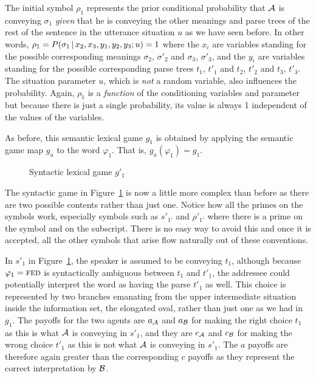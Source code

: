 The initial symbol $\rho_1$ represents the prior conditional probability that $\cal A$ is conveying $\sigma_1$ \emph{given} that he is conveying the other meanings and parse trees of the rest of the sentence in the utterance situation $u$ as we have seen before. In other words, $\rho_1 = P(\sigma_1 \,|\, x_2, x_3, y_1, y_2, y_3; u) = 1$ where the $x_i$ are variables standing for the possible corresponding meanings $\sigma_2$, $\sigma'_2$ and $\sigma_3$, $\sigma'_3$, and the $y_i$ are variables standing for the possible corresponding parse trees $t_1$, $t'_1$ and $t_2$, $t'_2$ and $t_3$, $t'_3$. The situation parameter $u$, which is \emph{not} a random variable, also influences the probability. Again, $\rho_1$ is a \emph{function} of the conditioning variables and parameter but because there is just a single probability, its value is always 1 independent of the values of the variables. 

As before, this semantic lexical game $g_1$ is obtained by applying the semantic game map $g_u$ to the word $\varphi_1$. That is, $g_u(\varphi_1) = g_1$.

\begin{figure}[h] 

\caption{Syntactic lexical game $g'_1$}
\label{fig:syntactic lexical game g1' - new example}
\end{figure}

The syntactic game in Figure~\ref{fig:syntactic lexical game g1' - new example} is now a little more complex than before as there are two possible contents rather than just one. Notice how all the primes on the symbols work, especially symbols such as $s'_{1'}$ and $\rho'_{1'}$ where there is a prime on the symbol and on the subscript. There is no easy way to avoid this and once it is accepted, all the other symbols that arise flow naturally out of these conventions.

In $s'_1$ in Figure~\ref{fig:syntactic lexical game g1' - new example}, the speaker is assumed to be conveying $t_1$, although because $\varphi_1 = \Expression{Fed}$ is syntactically ambiguous between $t_1$ and $t'_1$, the addressee could potentially interpret the word as having the parse $t'_1$ as well. This choice is represented by two branches emanating from the upper intermediate situation inside the information set, the elongated oval, rather than just one as we had in $g_1$. The payoffs for the two agents are $a_{\cal A}$ and $a_{\cal B}$ for making the right choice $t_1$ as this is what $\cal A$ is conveying in $s'_1$, and they are $c_{\cal A}$ and $c_{\cal B}$ for making the wrong choice $t'_1$ as this is not what $\cal A$ is conveying in $s'_1$. The $a$ payoffs are therefore again greater than the corresponding $c$ payoffs as they represent the correct interpretation by $\cal B$.

